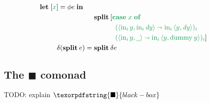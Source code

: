 \documentclass{rntz}\usepackage[a5]{rntzgeometry}\usepackage[fullwidth=130mm,width=330pt,]{narrow}
\newcommand\mathvar[1]{\ensuremath{#1}} %
\renewcommand\mathvar[1]{\ensuremath{\mathit{#1}}} %
\newcommand\todo[1]{{\color{ACMRed}#1}}
\newcommand\isocolor{\color{ForestGreen}} %
\newcommand\naive{na\"ive}
\newcommand\injc{\text{in}}
\newcommand\inj[1]{\injc_{#1}\,}
\newcommand\<{\mskip 4mu plus 4mu minus 1mu}
\newcommand\dx{\mathvar{dx}}
\newcommand\dy{\mathvar{dy}}
\newcommand\blackiso{{\texorpdfstring{\ensuremath{\blacksquare}}{black-box}}}
\newcommand\fname\text
\newcommand\dummy{\fname{dummy}}
\newcommand\kwname\textbf
\newcommand\ecase[1]{\kwname{case} \;{#1}\; \kwname{of}\;}
\newcommand\caseto\shortrightarrow
\newcommand\ebox[1]{[{#1}]}
\newcommand\elet[1]{\kwname{let}\;#1\;\kwname{in}\;}
\newcommand\eboxd[1]{\ebox{\isocolor #1}}
\newcommand\pwild{\underline{\phantom{a}}}
\newcommand\etuple[1]{\langle{#1}\rangle}
\newcommand\splitsum{\kwname{split}\<}
\begin{document}
\begin{figure*}
\begin{align*}
    \elet{\eboxd{x} = \phi e}\\
    &\phantom{{}={}} \splitsum [\isocolor \ecase x\\
    &\phantom{= \splitsum}\quad\isocolor
      (\etuple{\inj i y, \inj i \dy} \caseto \inj i \etuple{y,\dy})_i\\
    &\phantom{= \splitsum}\quad
      {\isocolor(\etuple{\inj i y, \pwild}
        \caseto \inj i \etuple{y, \dummy\<y})_i}]
    \\
    \delta(\splitsum e) &= \splitsum \delta e
  \end{align*}
  \caption{Semi\naive{} term translation}
\end{figure*}

\subsection{The \blackiso{} comonad}

\todo{TODO: explain $\blackiso$}
\end{document}
